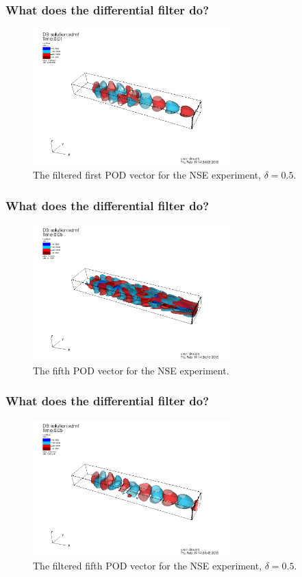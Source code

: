 \documentclass[mathserif]{beamer}
\begin{document}
    \begin{frame}
        \frametitle{What does the differential filter do?}
        \begin{figure}
            \includegraphics[width=3in]{../Pictures/NSE/filtered-pod-vector-1.png}
            \caption{The filtered first POD vector for the NSE experiment,
            $\delta = 0.5$.}
        \end{figure}
    \end{frame}

    \begin{frame}
        \frametitle{What does the differential filter do?}
        \begin{figure}
            \includegraphics[width=3in]{../Pictures/NSE/pod-vector-5.png}
            \caption{The fifth POD vector for the NSE experiment.}
        \end{figure}
    \end{frame}

    \begin{frame}
        \frametitle{What does the differential filter do?}
        \begin{figure}
            \includegraphics[width=3in]{../Pictures/NSE/filtered-pod-vector-5.png}
            \caption{The filtered fifth POD vector for the NSE experiment,
            $\delta = 0.5$.}
        \end{figure}
    \end{frame}
\end{document}
